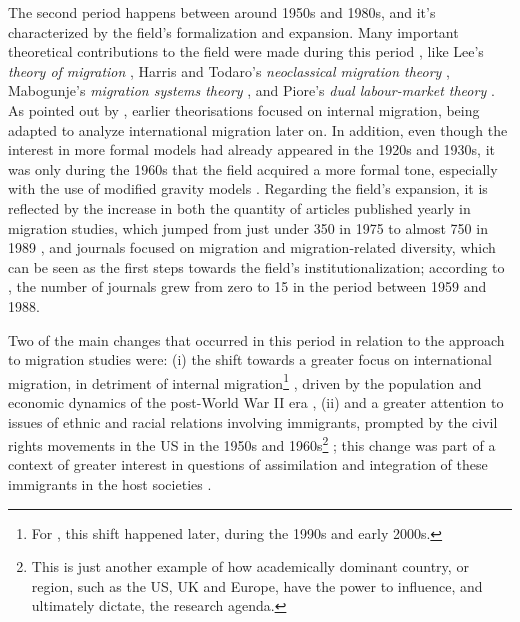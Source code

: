 The second period happens between around 1950s and 1980s, and it's characterized by the field's formalization and expansion. Many important theoretical contributions to the field were made during this period \citep{massey_theories_1993, de_haas_theory_2021}, like Lee’s \textit{theory of migration} \citep{lee_theory_1966}, Harris and Todaro’s \textit{neoclassical migration theory} \citep{todaro_model_1969, harris_migration_1970}, Mabogunje's \textit{migration systems theory} \citep{mabogunje_systems_1970}, and Piore’s \textit{dual labour-market theory} \citep{piore_birds_1979}. As pointed out by \cite{king_mind_2010}, earlier theorisations focused on internal migration, being adapted to analyze international migration later on. In addition, even though the interest in more formal models had already appeared in the 1920s and 1930s, it was only during the 1960s that the field acquired a more formal tone, especially with the use of modified gravity models \citep{greenwood_early_2003}. Regarding the field's expansion, it is reflected by the increase in both the quantity of articles published yearly in migration studies, which jumped from just under 350 in 1975 to almost 750 in 1989 \citep{levy_between_2020, scholten_introduction_2022}, and journals focused on migration and migration-related diversity, which can be seen as the first steps towards the field's institutionalization; according to \cite{pisarevskaya_mapping_2020}, the number of journals grew from zero to 15 in the period between 1959 and 1988. 

Two of the main changes that occurred in this period in relation to the approach to migration studies were: (i) the shift towards a greater focus on international migration, in detriment of internal migration\footnote{For \cite{king_mind_2010}, this shift happened later, during the 1990s and early 2000s.} \citep{scholten_introduction_2022}, driven by the population and economic dynamics of the post-World War II era \citep{castles_migration_2014}, (ii) and a greater attention to issues of ethnic and racial relations involving immigrants, prompted by the civil rights movements in the US in the 1950s and 1960s\footnote{This is just another example of how academically dominant country, or region, such as the US, UK and Europe, have the power to influence, and ultimately dictate, the research agenda.} \citep{portes_immigrant_1978, pedraza-bailey_immigration_1990}; this change was part of a context of greater interest in questions of assimilation and integration of these immigrants in the host societies \citep{scholten_introduction_2022}.

